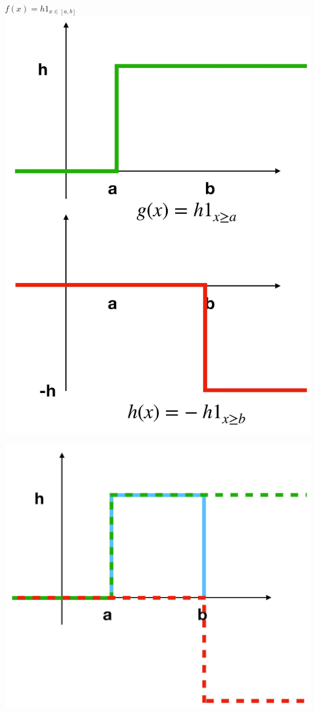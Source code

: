\documentclass[10pt]{article}
\begin{document}
$f(x)=h 1_{x \in[a, b]}$
\includegraphics[max width=\textwidth, center]{2024_01_08_0e0dcffe4bc8c6049046g-23(2)}

\begin{center}
\includegraphics[max width=\textwidth]{2024_01_08_0e0dcffe4bc8c6049046g-23(1)}
\end{center}
\end{document}
